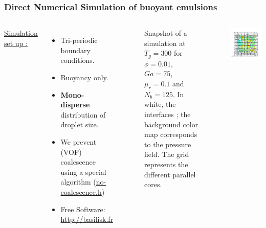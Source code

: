 \documentclass{sintefbeamer}
\begin{document}
\begin{frame}
  \frametitle{Direct Numerical Simulation of buoyant emulsions}
  \begin{columns}
  \underline{Simulation set up :} 
  \begin{itemize}
  \item Tri-periodic boundary conditions.
  \item Buoyancy only.
  \item \textbf{Mono-disperse} distribution of droplet size.
  \item We prevent (VOF) coalescence using a special algorithm 
    (\href{http://basilisk.fr/src/no-coalescence.h}{no-coalescence.h})
  \item Free Software: \url{http://basilisk.fr}
  \end{itemize}
  
  \begin{figure}
    \caption{Snapshot of a simulation at $T_g = 300$ for $\phi = 0.01$, $Ga = 75$, $\mu_r = 0.1$ and $N_b = 125$. In white, the interfaces ; the background color map corresponds to the pressure field. The grid represents the different parallel cores.
    }
  \end{figure}
  \centering
  \href{file:///work/fintzin/BUBLLES_PROJECT/movies/layers.mp4}{}
  \includegraphics[width =  1.1\textwidth]{image/PHI_01_Ga_75.png}
  \end{columns}
  \end{frame}
  
\end{document}
